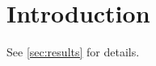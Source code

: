 \documentclass{article}
\begin{document}
\section{Introduction}
\label{sec:intro}
See \ref{sec:results} for details.

\end{document}

